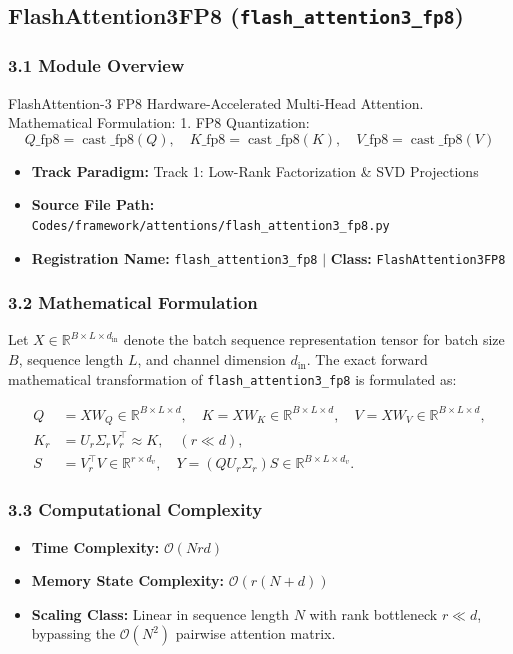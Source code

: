 \subsection{FlashAttention3FP8 (\texttt{flash\_attention3\_fp8})}
\label{sec:app_module_flash\_attention3\_fp8}

\subsubsection*{3.1 Module Overview}
FlashAttention-3 FP8 Hardware-Accelerated Multi-Head Attention.  Mathematical Formulation:     1. FP8 Quantization:        $$Q\_{\text{fp8}} = \operatorname{cast}\_{\text{fp8}}(Q), \quad K\_{\text{fp8}} = \operatorname{cast}\_{\text{fp8}}(K), \quad V\_{\text{fp8}} = \operatorname{cast}\_{\text{fp8}}(V)$$ 
\begin{itemize}
    \item \textbf{Track Paradigm:} Track 1: Low-Rank Factorization & SVD Projections
    \item \textbf{Source File Path:} \texttt{Codes/framework/attentions/flash\_attention3\_fp8.py}
    \item \textbf{Registration Name:} \texttt{flash\_attention3\_fp8} $\mid$ \textbf{Class:} \texttt{FlashAttention3FP8}
\end{itemize}

\subsubsection*{3.2 Mathematical Formulation}
Let $X \in \mathbb{R}^{B \times L \times d_{\text{in}}}$ denote the batch sequence representation tensor for batch size $B$, sequence length $L$, and channel dimension $d_{\text{in}}$. The exact forward mathematical transformation of \texttt{flash\_attention3\_fp8} is formulated as:

\begin{align}
Q &= X W_Q \in \mathbb{R}^{B \times L \times d}, \quad K = X W_K \in \mathbb{R}^{B \times L \times d}, \quad V = X W_V \in \mathbb{R}^{B \times L \times d}, \\
K_r &= U_r \Sigma_r V_r^\top \approx K, \quad (r \ll d), \\
S &= V_r^\top V \in \mathbb{R}^{r \times d_v}, \quad Y = (Q U_r \Sigma_r) S \in \mathbb{R}^{B \times L \times d_v}.
\end{align}


\subsubsection*{3.3 Computational Complexity}
\begin{itemize}
    \item \textbf{Time Complexity:} $\mathcal{O}(N r d)$
    \item \textbf{Memory State Complexity:} $\mathcal{O}(r(N + d))$
    \item \textbf{Scaling Class:} Linear in sequence length $N$ with rank bottleneck $r \ll d$, bypassing the $\mathcal{O}(N^2)$ pairwise attention matrix.
\end{itemize}

